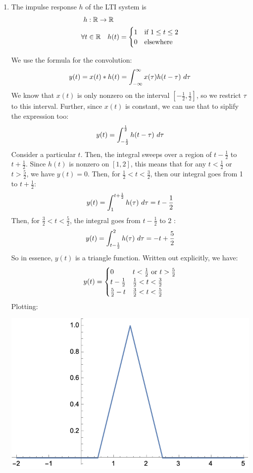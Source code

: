 \documentclass[10pt]{article}
\begin{document}
	\begin{enumerate}[label=\alph*)]
		\item The impulse response \( h \) of the LTI system is 
			\begin{align*}
				h &: \mathbb R \to \mathbb R\\
				\forall t &\in \mathbb R \ \ \  h(t) = \begin{cases}
					1 & \text{if \( 1 \le  t \le  2 \)}\\
					0 & \text{elsewhere}
				\end{cases}
			\end{align*}

			\begin{solution}
				We use the formula for the convolution:
				\[
				y(t) = x(t) * h(t) = \int_{-\infty}^{\infty} x(\tau) h(t - \tau) \ d \tau 
				\] 
				We know that \( x(t) \) is only nonzero on the interval \( [-\frac{1}{2}, \frac{1}{2}] \), so 
				we restrict \( \tau \) to this interval. Further, since \( x(t) \) is constant, we can use that 
				to siplify the expression too:
				\[
					y(t) = \int_{-\frac{1}{2}}^{\frac{1}{2}} h(t - \tau) \ d \tau 
				\] 
				Consider a particular \( t \). Then, the integral sweeps over a region of \( t - \frac{1}{2} \) to 
				\( t + \frac{1}{2} \). Since  \( h(t) \) is nonzero on \( [1, 2] \), this means that for any 
				\( t < \frac{1}{2} \) or \( t > \frac{5}{2} \), we have \( y(t) = 0 \). Then, for 
				\( \frac{1}{2} < t < \frac{3}{2} \), then our integral goes from 1 to \( t + \frac{1}{2} \): 
				\[
				y(t) = \int_{1}^{t + \frac{1}{2}} h(\tau)\ d \tau = t-\frac{1}{2}
				\] 
				Then, for \( \frac{3}{2} < t < \frac{5}{2} \), the integral goes from \( t - \frac{1}{2} \) to 
				\( 2 \) :
				\[
				y(t) = \int_{t - \frac{1}{2}}^{2} h(\tau) \ d \tau =  -t + \frac{5}{2}
				\] 
				So in essence, \( y(t) \) is a triangle function. Written out explicitly, we have: 
				\[
				y(t) = \begin{cases}
					0 & \text{\( t < \frac{1}{2} \) or \( t > \frac{5}{2} \)}\\
					t - \frac{1}{2} & \frac{1}{2} < t < \frac{3}{2}\\
					\frac{5}{2} - t & \frac{3}{2} < t < \frac{5}{2}
				\end{cases}
				\] 
				Plotting: 
				\begin{center}
					\includegraphics[scale=0.8]{q5a.png}

\end{center}
\end{solution}
\end{enumerate}
\end{document}
